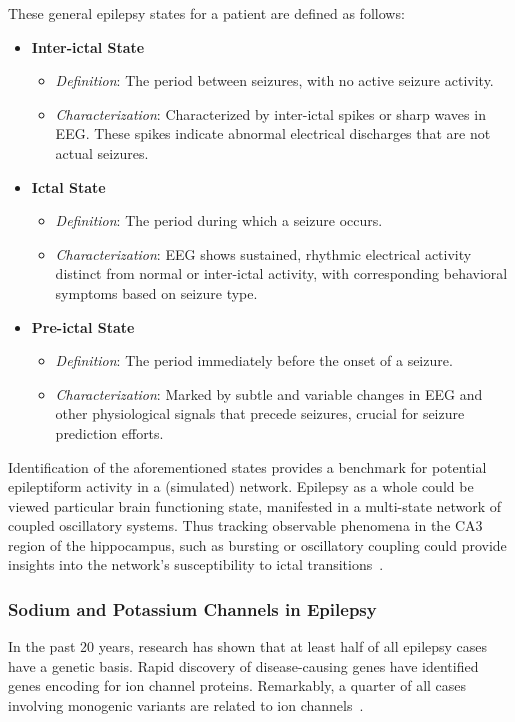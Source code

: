 These general epilepsy states for a patient are defined as follows:
\begin{itemize}
    \item \textbf{Inter-ictal State}
          \begin{itemize}
              \item \textit{Definition}: The period between seizures, with no active seizure activity.
              \item \textit{Characterization}: Characterized by inter-ictal spikes or sharp waves in EEG\@.
                    These spikes indicate abnormal electrical discharges that are not actual seizures.
          \end{itemize}
    \item \textbf{Ictal State}
          \begin{itemize}
              \item \textit{Definition}: The period during which a seizure occurs.
              \item \textit{Characterization}: EEG shows sustained, rhythmic electrical activity distinct from normal or inter-ictal activity,
                    with corresponding behavioral symptoms based on seizure type.
          \end{itemize}
    \item \textbf{Pre-ictal State}
          \begin{itemize}
              \item \textit{Definition}: The period immediately before the onset of a seizure.
              \item \textit{Characterization}: Marked by subtle and variable changes in EEG and other physiological signals that precede seizures,
                    crucial for seizure prediction efforts.
          \end{itemize}
\end{itemize}

\noindent
Identification of the aforementioned states provides a benchmark for potential epileptiform activity in a (simulated) network.
Epilepsy as a whole could be viewed particular brain functioning state, manifested in a multi-state network of coupled oscillatory systems.
Thus tracking observable phenomena in the CA3 region of the hippocampus, such as bursting or oscillatory coupling could provide insights
into the network's susceptibility to ictal transitions~\parencite{kalitzinEpilepsyManifestationMultistate2019a}.

\subsubsection{Sodium and Potassium Channels in Epilepsy}
In the past 20 years, research has shown that at least half of all epilepsy cases have a genetic basis.
Rapid discovery of disease-causing genes have identified genes encoding for ion channel proteins.
Remarkably, a quarter of all cases involving monogenic variants are related to ion channels~\parencite{strianoGeneticTestingPrecision2020,oyrerIonChannelsGenetic2018}.

